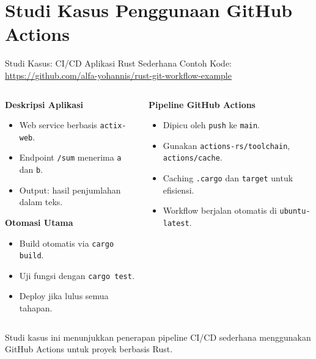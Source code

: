 \documentclass[aspectratio=169, table]{beamer}
\begin{document}
\section{Studi Kasus Penggunaan GitHub Actions}

\begin{frame}[fragile]{Studi Kasus: CI/CD Aplikasi Rust Sederhana}
	\vspace{20pt}
	Contoh Kode: \url{https://github.com/alfa-yohannis/rust-git-workflow-example}
	\begin{columns}[T]
		\begin{column}{0.5\textwidth}
			\textbf{Deskripsi Aplikasi}
			\begin{itemize}
				\item Web service berbasis \texttt{actix-web}.
				\item Endpoint \texttt{/sum} menerima \texttt{a} dan \texttt{b}.
				\item Output: hasil penjumlahan dalam teks.
			\end{itemize}
			
			\vspace{4pt}
			\textbf{Otomasi Utama}
			\begin{itemize}
				\item Build otomatis via \texttt{cargo build}.
				\item Uji fungsi dengan \texttt{cargo test}.
				\item Deploy jika lulus semua tahapan.
			\end{itemize}
		\end{column}
		
		\begin{column}{0.5\textwidth}
			\textbf{Pipeline GitHub Actions}
			\begin{itemize}
				\item Dipicu oleh \texttt{push} ke \texttt{main}.
				\item Gunakan \texttt{actions-rs/toolchain}, \texttt{actions/cache}.
				\item Caching \texttt{.cargo} dan \texttt{target} untuk efisiensi.
				\item Workflow berjalan otomatis di \texttt{ubuntu-latest}.
			\end{itemize}
			
			
		\end{column}
	\end{columns}
\vspace{6pt}
Studi kasus ini menunjukkan penerapan pipeline CI/CD sederhana menggunakan GitHub Actions untuk proyek berbasis Rust.
\end{frame}
\end{document}
